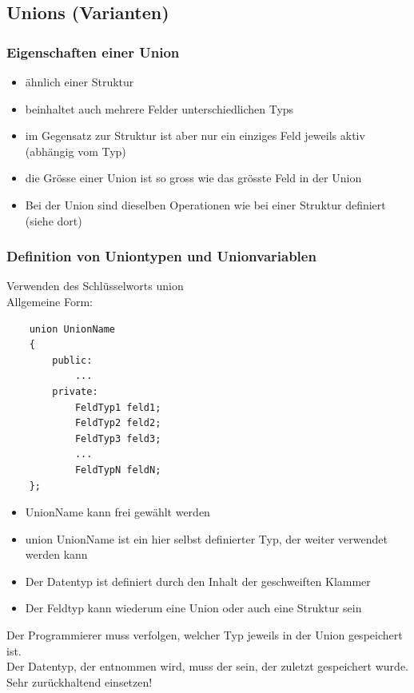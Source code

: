\subsection{Unions (Varianten)}
\label{sec:Unions (Varianten)}

\subsubsection{Eigenschaften einer Union}
\label{sec:Eigenschaften einer Union}
\begin{itemize}
	\item ähnlich einer Struktur
	\item beinhaltet auch mehrere Felder unterschiedlichen Typs
	\item im Gegensatz zur Struktur ist aber nur ein einziges Feld jeweils aktiv (abhängig vom Typ)
	\item die Grösse einer Union ist so gross wie das grösste Feld in der Union
	\item Bei der Union sind dieselben Operationen wie bei einer Struktur definiert (siehe dort)
\end{itemize}

\subsubsection{Definition von Uniontypen und Unionvariablen}
\label{sec:Definition von Uniontypen und Unionvariablen}
Verwenden des Schlüsselworts union\\
Allgemeine Form:
\noindent
\begin{minipage}{\linewidth}
	\begin{lstlisting}
	union UnionName
	{
		public:				
			...
		private:
			FeldTyp1 feld1;
			FeldTyp2 feld2;
			FeldTyp3 feld3;
			...
			FeldTypN feldN;
	};
	\end{lstlisting}
\end{minipage}
\begin{itemize}
	\item UnionName kann frei gewählt werden
	\item union UnionName ist ein hier selbst definierter Typ, der weiter verwendet werden kann
	\item Der Datentyp ist definiert durch den Inhalt der geschweiften Klammer
	\item Der Feldtyp kann wiederum eine Union oder auch eine Struktur sein
\end{itemize}
\begin{achtung}
Der Programmierer muss verfolgen, welcher Typ jeweils in der Union gespeichert ist.\\
Der Datentyp, der entnommen wird, muss der sein, der zuletzt gespeichert wurde.\\
Sehr zurückhaltend einsetzen!
\end{achtung}


